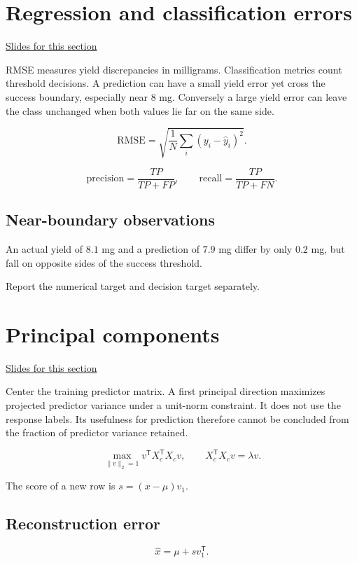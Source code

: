 \documentclass[11pt,letterpaper]{article}
\theoremstyle{definition}\newtheorem{definition}{Definition}\newtheorem{example}{Example}
\numberwithin{equation}{section}
\begin{document}
\section{Regression and classification errors}
\hypertarget{note-regression-and-classification-errors}{}\label{note:regression-and-classification-errors}
{\small \href{slides.html\#frame=heldout-predictions-figure\&step=1}{Slides for this section}}\par
RMSE measures yield discrepancies in milligrams. Classification metrics count threshold decisions. A prediction can have a small yield error yet cross the success boundary, especially near 8 mg. Conversely a large yield error can leave the class unchanged when both values lie far on the same side.

\[
\mathrm{RMSE}=\sqrt{\frac1N\sum_i(y_i-\widehat y_i)^2}.
\]

\[
\mathrm{precision}=\frac{TP}{TP+FP},\qquad
\mathrm{recall}=\frac{TP}{TP+FN}.
\]

\subsection*{Near-boundary observations}
An actual yield of $8.1$ mg and a prediction of $7.9$ mg differ by only $0.2$ mg, but fall on opposite sides of the success threshold.

Report the numerical target and decision target separately.
\section{Principal components}
\hypertarget{note-principal-components}{}\label{note:principal-components}
{\small \href{slides.html\#frame=principal-components\&step=1}{Slides for this section}}\par
Center the training predictor matrix. A first principal direction maximizes projected predictor variance under a unit-norm constraint. It does not use the response labels. Its usefulness for prediction therefore cannot be concluded from the fraction of predictor variance retained.

\[
\max_{\|v\|_2=1}v^{\mathsf T}X_c^{\mathsf T}X_cv,
\qquad X_c^{\mathsf T}X_cv=\lambda v.
\]

The score of a new row is $s=(x-\mu)v_1$.

\subsection*{Reconstruction error}
\[
\widehat x=\mu+sv_1^{\mathsf T}.
\]
\end{document}
